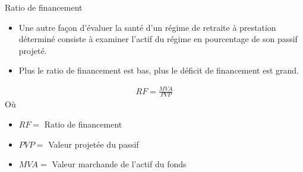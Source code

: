 \documentclass{beamer}
\begin{document}
\begin{frame}{Ratio de financement}
\begin{itemize}[label=\bullet]
\item Une autre façon d’évaluer la santé d’un régime de retraite à prestation déterminé consiste à examiner l’actif du régime en pourcentage de son passif projeté.
\item Plus le ratio de financement est bas, plus le déficit de financement est grand.
\end{itemize}
\begin{align*}
RF=\frac{MVA}{PVP}
\end{align*}
Où
\begin{itemize}[label=\bullet]
\item $RF=$ Ratio de financement
\item $PVP=$ Valeur projetée du passif
\item $MVA=$ Valeur marchande de l'actif du fonds
\end{itemize}
\end{frame}
\end{document}
